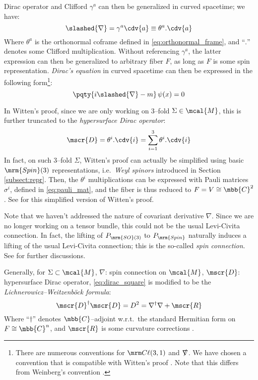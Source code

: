 \documentclass[a4paper,11pt]{article}
\begin{document}
	Dirac operator and Clifford $\gamma^a$ can then be generalized in curved spacetime; we have:
	\begin{equation}
		\slashed{\nabla} = \gamma^a \cdv{a}
		\equiv \theta^a.\cdv{a}
	\end{equation}
	Where $\theta^a$ is the orthonormal coframe defined in \eqref{eq:orthonormal_frame}, and ``$.$'' denotes some Clifford multiplication. Without referencing $\gamma^a$, the latter expression can then be generalized to arbitrary fiber $F$, as long as $F$ is some spin representation. \textit{Dirac's equation} in curved spacetime can then be expressed in the following form\footnote{
		There are numerous conventions for $\cliff(3,1)$ and $\slashed{\nabla}$. We have chosen a convention that is compatible with Witten's proof \cite{Witten:1981mf,Parker:1981uy}. Note that this differs from Weinberg's convention \cite{Weinberg:1995mt}. 
	}:
	\begin{equation}
		\pqty{i\slashed{\nabla} - m}\,\psi(x) = 0
	\end{equation}
	
	In Witten's proof, since we are only working on 3--fold $\Sigma\in\mcal{M}$, this is further truncated to the \textit{hypersurface Dirac operator}:
	\begin{equation}
		\mscr{D} = \theta^i.\cdv{i}
		= \sum_{i=1}^{3} \theta^i.\cdv{i}
		\label{eq:hypersurface_dirac}
	\end{equation}
	In fact, on such 3--fold $\Sigma$, Witten's proof can actually be simplified using basic $\mrm{Spin}(3)$ representations, i.e.~\textit{Weyl spinors} introduced in Section \ref{subsect:repr}. Then, the $\theta^i$ multiplications can be expressed with Pauli matrices $\sigma^i$, defined in \eqref{eq:pauli_mat}, and the fiber is thus reduced to $F = V\cong \mbb{C}^2$. See \cite{Straumann:2013spu} for this simplified version of Witten's proof. 
	
	Note that we haven't addressed the nature of covariant derivative $\nabla$. Since we are no longer working on a tensor bundle, this could not be the usual Levi-Civita connection. In fact, the lifting of $P_{\mrm{SO}(3)}$ to $P_{\mrm{Spin}}$ naturally induces a lifting of the usual Levi-Civita connection; this is the so-called \textit{spin connection}. See \cite{figueroa2010spin,Wernli:2019hpf} for further discussions. 
	
	Generally, for $\Sigma\subset\mcal{M}$, $\nabla$: spin connection on $\mcal{M}$, $\mscr{D}$: hypersurface Dirac operator, \eqref{eq:dirac_square} is modified to be the \textit{Lichnerowicz–Weitzenböck formula}:
	\begin{equation}
		\mscr{D}^\dagger\mscr{D}
		= D^2 = \nabla^\dagger \nabla + \mscr{R}
		\label{eq:fancy_math_formula}
	\end{equation}
	Where ``$\dagger$'' denotes $\mbb{C}$--adjoint w.r.t.~the standard Hermitian form on $F\cong\mbb{C}^n$, and $\mscr{R}$ is some curvature corrections \cite{Parker:1981uy}. 
\end{document}
